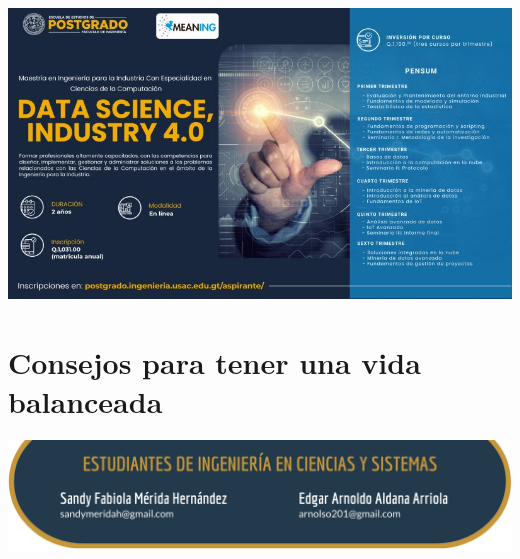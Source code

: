 \documentclass[12pt,spanish,Letterpaper,openany]{book}
\begin{document}
\begin{center}\includegraphics[width=1\linewidth]{images/publicidad15} \end{center}

\hypertarget{pareja43}{%
\chapter{Consejos para tener una vida balanceada}\label{pareja43}}

\begin{center}\includegraphics[width=1\linewidth]{images/pareja43_image1} \end{center}
\end{document}
